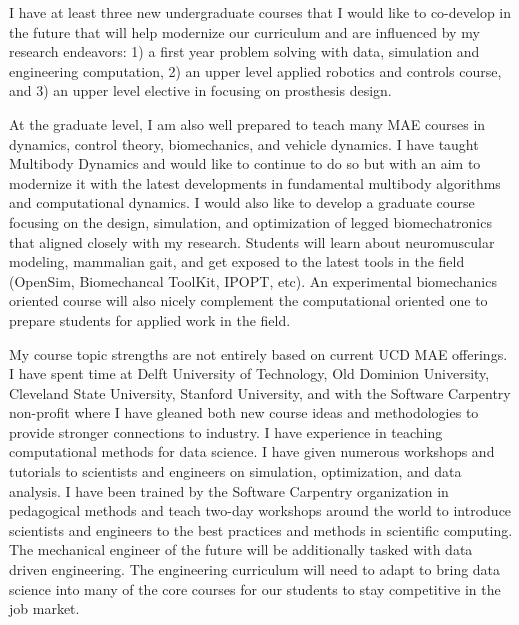 \documentclass{article}
\begin{document}
I have at least three new undergraduate courses that I would like to co-develop
in the future that will help modernize our curriculum and are influenced by my
research endeavors: 1) a first year problem solving with data, simulation and
engineering computation, 2) an upper level applied robotics and controls
course, and 3) an upper level elective in focusing on prosthesis design.

At the graduate level, I am also well prepared to teach many MAE courses in
dynamics, control theory, biomechanics, and vehicle dynamics. I have taught
Multibody Dynamics and would like to continue to do so but with an aim to
modernize it with the latest developments in fundamental multibody algorithms
and computational dynamics. I would also like to develop a graduate course
focusing on the design, simulation, and optimization of legged biomechatronics
that aligned closely with my research.  Students will learn about neuromuscular
modeling, mammalian gait, and get exposed to the latest tools in the field
(OpenSim, Biomechancal ToolKit, IPOPT, etc). An experimental biomechanics
oriented course will also nicely complement the computational oriented one to
prepare students for applied work in the field.

My course topic strengths are not entirely based on current UCD MAE offerings.
I have spent time at Delft University of Technology, Old Dominion University,
Cleveland State University, Stanford University, and with the Software
Carpentry non-profit where I have gleaned both new course ideas and
methodologies to provide stronger connections to industry. I have experience in
teaching computational methods for data science. I have given numerous
workshops and tutorials to scientists and engineers on simulation,
optimization, and data analysis. I have been trained by the Software Carpentry
organization in pedagogical methods and teach two-day workshops around the
world to introduce scientists and engineers to the best practices and methods
in scientific computing. The mechanical engineer of the future will be
additionally tasked with data driven engineering. The engineering curriculum
will need to adapt to bring data science into many of the core courses for our
students to stay competitive in the job market.
\end{document}
